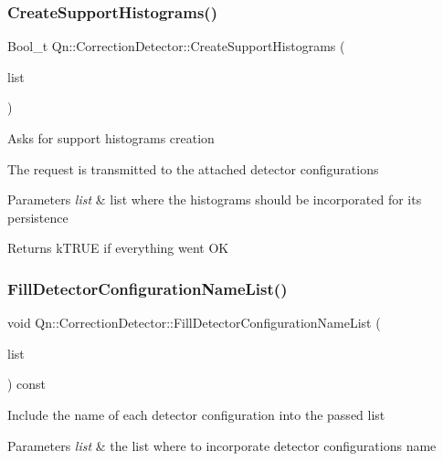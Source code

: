 \subsubsection{\texorpdfstring{Create\+Support\+Histograms()}{CreateSupportHistograms()}}
{\footnotesize\ttfamily Bool\+\_\+t Qn\+::\+Correction\+Detector\+::\+Create\+Support\+Histograms (\begin{DoxyParamCaption}\item[{T\+List $\ast$}]{list }\end{DoxyParamCaption})}

Asks for support histograms creation

The request is transmitted to the attached detector configurations 
\begin{DoxyParams}{Parameters}
{\em list} & list where the histograms should be incorporated for its persistence \\
\hline
\end{DoxyParams}
\begin{DoxyReturn}{Returns}
k\+T\+R\+UE if everything went OK 
\end{DoxyReturn}
\mbox{\label{classQn_1_1CorrectionDetector_a7605d01ec9abe6675b325d6ae2d710e9}} 
\subsubsection{\texorpdfstring{Fill\+Detector\+Configuration\+Name\+List()}{FillDetectorConfigurationNameList()}}
{\footnotesize\ttfamily void Qn\+::\+Correction\+Detector\+::\+Fill\+Detector\+Configuration\+Name\+List (\begin{DoxyParamCaption}\item[{T\+List $\ast$}]{list }\end{DoxyParamCaption}) const}

Include the name of each detector configuration into the passed list


\begin{DoxyParams}{Parameters}
{\em list} & the list where to incorporate detector configurations name \\
\hline
\end{DoxyParams}
\mbox{\label{classQn_1_1CorrectionDetector_af4426ef9b524025c09e6f78a156b8f5d}} 
